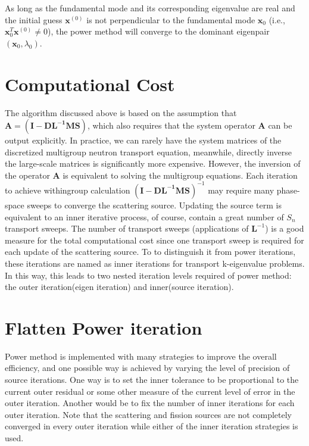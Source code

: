 As long as the fundamental mode and its corresponding eigenvalue are real and the initial guess $\mathbf{x}^{(0)}$ is not perpendicular to the fundamental mode $\mathbf{x}_0$ (i.e., $\mathbf{x}^T_0\mathbf{x}^{(0)} \neq 0$), the power method will converge to the dominant eigenpair $(\mathbf{x}_0, \lambda_0)$.

\section{Computational Cost}
The algorithm discussed above is based on the assumption that $\mathbf{A} =  \mathbf{(I - DL^{-1}MS)}$, which also requires that the system operator $\mathbf{A}$ can be output explicitly. 
In practice, we can rarely have the system matrices of the discretized multigroup neutron transport equation, meanwhile, directly inverse the large-scale matrices is significantly more expensive.
However, the inversion of the operator $\mathbf{A}$ is equivalent to solving the multigroup equations. 
Each iteration to achieve withingroup calculation $\mathbf{(I - DL^{-1}MS)}^{-1}$ may require many phase-space sweeps to converge the scattering source.
Updating the source term is equivalent to an inner iterative process, of course, contain a great number of $S_n$ transport sweeps. 
The number of transport sweeps (applications of $\mathbf{L}^{-1}$) is a good measure for the total computational cost since one transport sweep is required for each update of the scattering source.
To to distinguish it from power iterations, these iterations are named as inner iterations for transport k-eigenvalue problems.
In this way, this leads to two nested iteration levels required of power method: the outer iteration(eigen iteration) and inner(source iteration).

\section{Flatten Power iteration}
Power method is implemented with many strategies to improve the overall efficiency, and one possible way is achieved by varying the level of precision of source iterations.
One way is to set the inner tolerance to be proportional to the current outer residual or some other measure of the current level of error in the outer iteration.
Another would be to fix the number of inner iterations for each outer iteration.
Note that the scattering and fission sources are not completely converged in every outer iteration while either of the inner iteration strategies is used.
\citep{gill_newtons_2011}


